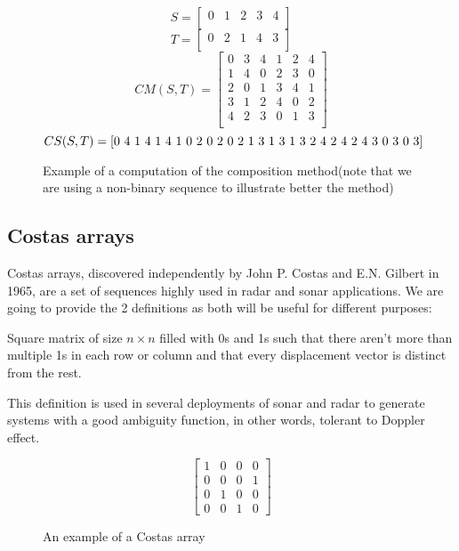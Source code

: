 \begin{figure}[ht!]
  $$S = \begin{bmatrix}
    0 & 1 & 2 & 3 & 4\\
  \end{bmatrix}$$
  $$T = \begin{bmatrix}
    0 & 2 & 1 & 4 & 3 \\
  \end{bmatrix}
  $$
  $$CM(S, T) = \begin{bmatrix}
  0 & 3 & 4 & 1 & 2 & 4\\
  1 & 4 & 0 & 2 & 3 & 0\\
  2 & 0 & 1 & 3 & 4 & 1\\
  3 & 1 & 2 & 4 & 0 & 2\\
  4 & 2 & 3 & 0 & 1 & 3\\
  \end{bmatrix}
  $$
  $$CS(S, T) = \text{[0 4 1 4 1 4 1 0 2 0 2 0 2 1 3 1 3 1 3 2 4 2 4 2 4 3 0 3 0 3]}\\
  $$
  \caption{Example of a computation of the composition method(note that we are
  using a non-binary sequence to illustrate better the method)}
  \label{}
\end{figure}

\subsection{Costas arrays}

Costas arrays, discovered independently by John P. Costas\cite{costas_costas}
and E.N. Gilbert \cite{gilbert_costas} in 1965, are a set of sequences highly
used in radar and sonar applications. We are going to provide the 2 definitions
as both will be useful for different purposes:

\begin{definition}
  Square matrix of size $n×n$ filled with 0s and 1s such that there
  aren't more than multiple 1s in each row or column and that every
  displacement vector is distinct from the rest.
\end{definition}

This definition is used in several deployments of sonar and radar to generate
systems with a good ambiguity function, in other words, tolerant to Doppler
effect.

\begin{figure}[ht!]
  $$
  \begin{bmatrix}
   1&0&0&0\\
   0&0&0&1\\
   0&1&0&0\\
   0&0&1&0
  \end{bmatrix}
  $$
  \caption{An example of a Costas array}
  \label{fig:costas_1}
\end{figure}

